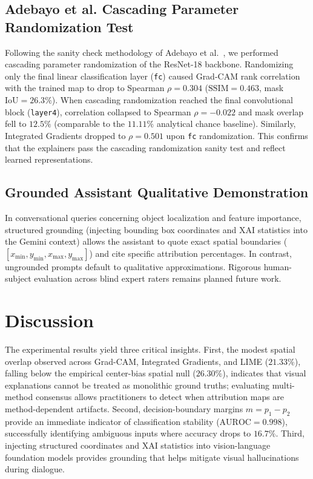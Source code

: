\documentclass[journal,10pt,twocolumn]{IEEEtran}
\begin{document}
\subsection{Adebayo et al. Cascading Parameter Randomization Test}
Following the sanity check methodology of Adebayo et al.~\cite{adebayo2018sanity}, we performed cascading parameter randomization of the ResNet-18 backbone. Randomizing only the final linear classification layer (\texttt{fc}) caused Grad-CAM rank correlation with the trained map to drop to Spearman $\rho = 0.304$ ($\text{SSIM} = 0.463$, mask $\text{IoU} = 26.3\%$). When cascading randomization reached the final convolutional block (\texttt{layer4}), correlation collapsed to Spearman $\rho = -0.022$ and mask overlap fell to $12.5\%$ (comparable to the $11.11\%$ analytical chance baseline). Similarly, Integrated Gradients dropped to $\rho = 0.501$ upon \texttt{fc} randomization. This confirms that the explainers pass the cascading randomization sanity test and reflect learned representations.

\subsection{Grounded Assistant Qualitative Demonstration}
In conversational queries concerning object localization and feature importance, structured grounding (injecting bounding box coordinates and XAI statistics into the Gemini context) allows the assistant to quote exact spatial boundaries ($[x_{\min}, y_{\min}, x_{\max}, y_{\max}]$) and cite specific attribution percentages. In contrast, ungrounded prompts default to qualitative approximations. Rigorous human-subject evaluation across blind expert raters remains planned future work.

\section{Discussion}
The experimental results yield three critical insights. First, the modest spatial overlap observed across Grad-CAM, Integrated Gradients, and LIME ($21.33\%$), falling below the empirical center-bias spatial null ($26.30\%$), indicates that visual explanations cannot be treated as monolithic ground truths; evaluating multi-method consensus allows practitioners to detect when attribution maps are method-dependent artifacts. Second, decision-boundary margins $m = p_1 - p_2$ provide an immediate indicator of classification stability ($\text{AUROC} = 0.998$), successfully identifying ambiguous inputs where accuracy drops to $16.7\%$. Third, injecting structured coordinates and XAI statistics into vision-language foundation models provides grounding that helps mitigate visual hallucinations during dialogue.
\end{document}
